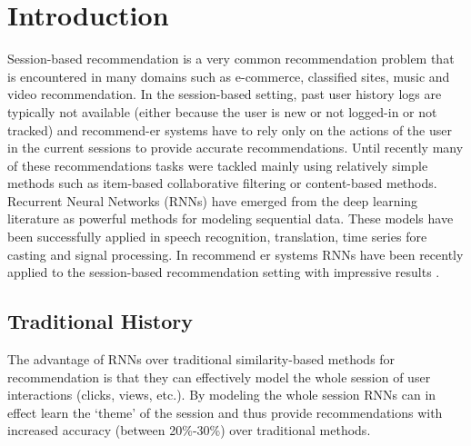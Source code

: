 \chapter{Introduction}


Session-based recommendation is a very common recommendation problem that is encountered in many domains such as e-commerce, classiﬁed sites, music and video recommendation. In the session-based setting, past user history logs are typically not available (either because the user is new or not logged-in or not tracked) and recommend-er systems have to rely only on the actions of the user in the current sessions to provide accurate recommendations. Until recently many of these recommendations tasks were tackled mainly using relatively simple methods such as item-based collaborative ﬁltering \cite{sarwar2001item} or content-based methods. Recurrent Neural Networks (RNNs) have emerged from the deep learning literature as powerful methods for modeling sequential data. These models have been successfully applied in speech recognition, translation, time series fore casting and signal processing. In recommend er systems RNNs have been recently applied to the session-based recommendation setting with impressive results \cite{hidasi2012fast}. 

\label{chap:introduction}
\section{Traditional History}
The advantage of RNNs over traditional similarity-based methods for recommendation is that they can effectively model the whole session of user interactions (clicks, views, etc.). By modeling the whole session RNNs can in effect learn the ‘theme’ of the session and thus provide recommendations with increased accuracy (between 20\%-30\%) over traditional methods.

